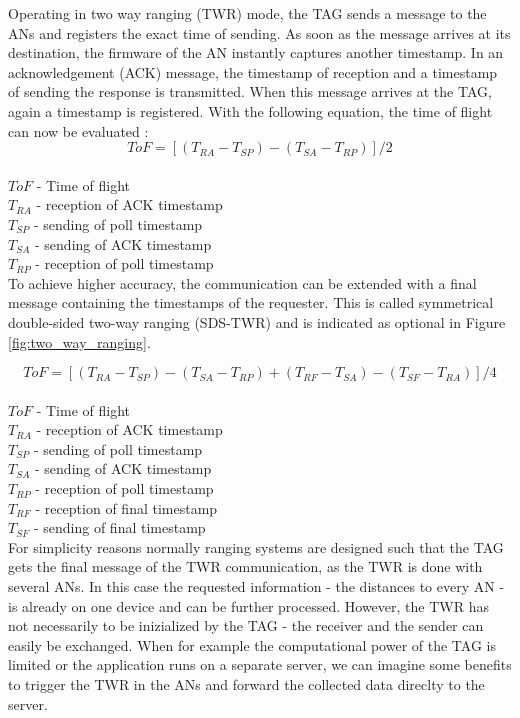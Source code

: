 Operating in two way ranging (TWR) mode, the TAG sends a message to the ANs and registers the exact time of sending. As soon as the message arrives at its destination, the firmware of the AN instantly captures another timestamp. In an acknowledgement (ACK) message, the timestamp of reception and a timestamp of sending the response is transmitted. When this message arrives at the TAG, again a timestamp is registered. With the following equation, the time of flight can now be evaluated \cite{SewioTWR}:
$$ ToF = [(T_{RA}-T_{SP})-(T_{SA}-T_{RP})] / 2$$\\
$ToF$ - Time of flight\\
$T_{RA}$ - reception of ACK timestamp\\
$T_{SP}$ - sending of poll timestamp\\
$T_{SA}$ - sending of ACK timestamp\\
$T_{RP}$ - reception of poll timestamp\\

To achieve higher accuracy, the communication can be extended with a final message containing the timestamps of the requester. This is called symmetrical double-sided two-way ranging (SDS-TWR) \cite{Wikipedia} and is indicated as optional in Figure \ref{fig:two_way_ranging}.

$$ ToF = [(T_{RA}-T_{SP})-(T_{SA}-T_{RP}) + (T_{RF}-T_{SA})-(T_{SF}-T_{RA}) ]/ 4$$\\
$ToF$ - Time of flight\\
$T_{RA}$ - reception of ACK timestamp\\
$T_{SP}$ - sending of poll timestamp\\
$T_{SA}$ - sending of ACK timestamp\\
$T_{RP}$ - reception of poll timestamp\\
$T_{RF}$ - reception of final timestamp\\
$T_{SF}$ - sending of final timestamp\\

For simplicity reasons normally ranging systems are designed such that the TAG gets the final message of the TWR communication, as the TWR is done with several ANs. In this case the requested information - the distances to every AN - is already on one device and can be further processed. However, the TWR has not necessarily to be inizialized by the TAG - the receiver and the sender can easily be exchanged. When for example the computational power of the TAG is limited or the application runs on a separate server, we can imagine some benefits to trigger the TWR in the ANs and forward the collected data direclty to the server.

